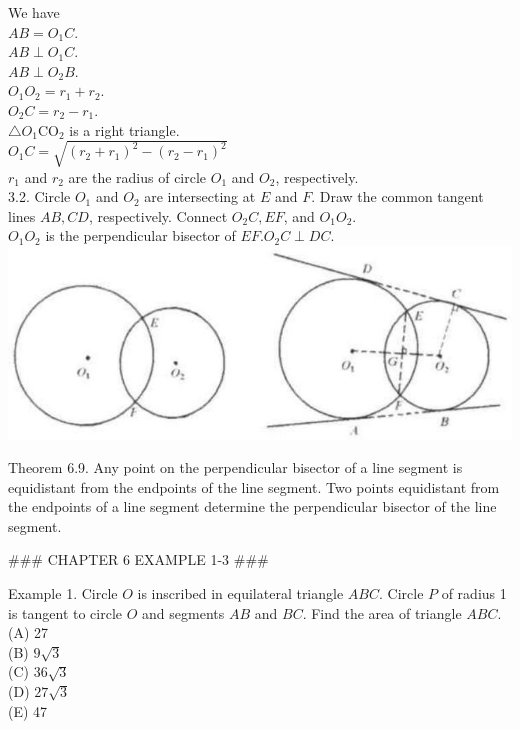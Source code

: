 \documentclass[10pt]{article}
\begin{document}
We have\\
\(A B=O_{1} C\).\\
\(A B \perp O_{1} C\).\\
\(A B \perp O_{2} B\).\\
\(O_{1} O_{2}=r_{1}+r_{2}\).\\
\(O_{2} C=r_{2}-r_{1}\).\\
\(\triangle O_{1} \mathrm{CO}_{2}\) is a right triangle.\\
\(O_{1} C=\sqrt{\left(r_{2}+r_{1}\right)^{2}-\left(r_{2}-r_{1}\right)^{2}}\)\\
\(r_{1}\) and \(r_{2}\) are the radius of circle \(O_{1}\) and \(O_{2}\), respectively.\\
3.2. Circle \(O_{1}\) and \(O_{2}\) are intersecting at \(E\) and \(F\). Draw the common tangent lines \(A B, C D\), respectively. Connect \(O_{2} C, E F\), and \(O_{1} O_{2}\).\\
\(O_{1} O_{2}\) is the perpendicular bisector of \(E F . O_{2} C \perp D C\).\\
\includegraphics[max width=\textwidth, center]{2025_04_17_97bc1f7e44d93c271a88g-175}

Theorem 6.9. Any point on the perpendicular bisector of a line segment is equidistant from the endpoints of the line segment. Two points equidistant from the endpoints of a line segment determine the perpendicular bisector of the line segment.


### CHAPTER 6 EXAMPLE 1-3 ###

Example 1. Circle \(O\) is inscribed in equilateral triangle \(A B C\). Circle \(P\) of radius 1 is tangent to circle \(O\) and segments \(A B\) and \(B C\). Find the area of triangle \(A B C\).\\
(A) 27\\
(B) \(9 \sqrt{3}\)\\
(C) \(36 \sqrt{3}\)\\
(D) \(27 \sqrt{3}\)\\
(E) 47
\end{document}
